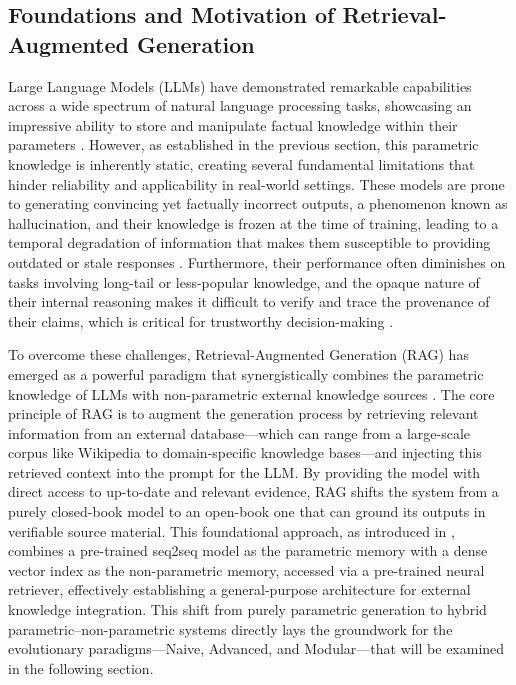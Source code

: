 \documentclass[11pt]{article}
\begin{document}
\subsection{Foundations and Motivation of Retrieval-Augmented Generation}

Large Language Models (LLMs) have demonstrated remarkable capabilities across a wide spectrum of natural language processing tasks, showcasing an impressive ability to store and manipulate factual knowledge within their parameters \cite{ref22}. However, as established in the previous section, this parametric knowledge is inherently static, creating several fundamental limitations that hinder reliability and applicability in real-world settings. These models are prone to generating convincing yet factually incorrect outputs, a phenomenon known as hallucination, and their knowledge is frozen at the time of training, leading to a temporal degradation of information that makes them susceptible to providing outdated or stale responses \cite{ref23,ref24}. Furthermore, their performance often diminishes on tasks involving long-tail or less-popular knowledge, and the opaque nature of their internal reasoning makes it difficult to verify and trace the provenance of their claims, which is critical for trustworthy decision-making \cite{ref24,ref25}.

To overcome these challenges, Retrieval-Augmented Generation (RAG) has emerged as a powerful paradigm that synergistically combines the parametric knowledge of LLMs with non-parametric external knowledge sources \cite{ref22}. The core principle of RAG is to augment the generation process by retrieving relevant information from an external database---which can range from a large-scale corpus like Wikipedia to domain-specific knowledge bases---and injecting this retrieved context into the prompt for the LLM. By providing the model with direct access to up-to-date and relevant evidence, RAG shifts the system from a purely closed-book model to an open-book one that can ground its outputs in verifiable source material. This foundational approach, as introduced in \cite{ref22}, combines a pre-trained seq2seq model as the parametric memory with a dense vector index as the non-parametric memory, accessed via a pre-trained neural retriever, effectively establishing a general-purpose architecture for external knowledge integration. This shift from purely parametric generation to hybrid parametric--non-parametric systems directly lays the groundwork for the evolutionary paradigms---Naive, Advanced, and Modular---that will be examined in the following section.
\end{document}
